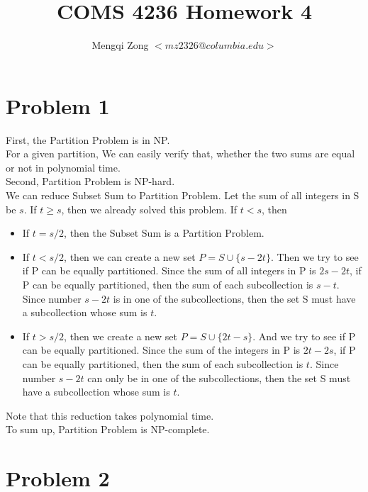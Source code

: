 \documentclass[12pt]{article}
\title{COMS 4236 Homework 4}
\author{Mengqi Zong $<mz2326@columbia.edu>$}
\begin{document}
\maketitle

\setlength{\parindent}{0in}

\section*{Problem 1}

First, the Partition Problem is in NP. \\

For a given partition, We can easily verify that, whether the two sums
are equal or not in polynomial time. \\

Second, Partition Problem is NP-hard. \\

We can reduce Subset Sum to Partition Problem. Let the sum of all
integers in S be $s$. If $t \ge s$, then we already solved this
problem. If $t < s$, then

\begin{itemize}
\item If $t = s / 2$, then the Subset Sum is a Partition Problem.
\item If $t < s / 2$, then we can create a new set $P = S \cup \{ s-2t
  \}$. Then we try to see if P can be equally partitioned. Since the 
  sum of all integers in P is $2s-2t$, if P can be equally
  partitioned, then the sum of each subcollection is $s - t$. Since
  number $s-2t$ is in one of the subcollections, then the set S must
  have a subcollection whose sum is $t$.
\item If $t > s / 2$, then we create a new set $P = S \cup \{ 2t-s
  \}$. And we try to see if P can be equally partitioned. Since the
  sum of the integers in P is $2t-2s$, if P can be equally
  partitioned, then the sum of each subcollection is $t$. Since number
  $s-2t$ can only be in one of the subcollections, then the set S must
  have a subcollection whose sum is $t$.
\end{itemize}

Note that this reduction takes polynomial time. \\

To sum up, Partition Problem is NP-complete. \\

\section*{Problem 2}
\end{document}
